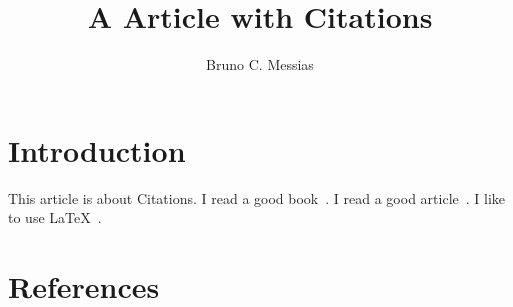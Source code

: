 \documentclass{article}
\title{A Article with Citations}
\author{Bruno C. Messias}
\date{}
\begin{document}
\maketitle

\section{Introduction}

This article is about Citations. I read a good book~\cite{smith2012}. I read a good article~\cite{hall2013}. I like to use \LaTeX~\cite{latex}.


\section{References}



\end{document}

